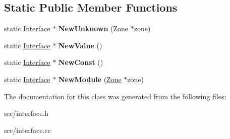 \subsection*{Static Public Member Functions}
\begin{DoxyCompactItemize}
\item 
\hypertarget{classv8_1_1internal_1_1_interface_a8392aeef5f642e6472d4b8c5621197be}{}static \hyperlink{classv8_1_1internal_1_1_interface}{Interface} $\ast$ {\bfseries New\+Unknown} (\hyperlink{classv8_1_1internal_1_1_zone}{Zone} $\ast$zone)\label{classv8_1_1internal_1_1_interface_a8392aeef5f642e6472d4b8c5621197be}

\item 
\hypertarget{classv8_1_1internal_1_1_interface_a6f67d744b08d96c0b52d095f8444f689}{}static \hyperlink{classv8_1_1internal_1_1_interface}{Interface} $\ast$ {\bfseries New\+Value} ()\label{classv8_1_1internal_1_1_interface_a6f67d744b08d96c0b52d095f8444f689}

\item 
\hypertarget{classv8_1_1internal_1_1_interface_ac5c4dd1a524544c34d6d93115c0db43a}{}static \hyperlink{classv8_1_1internal_1_1_interface}{Interface} $\ast$ {\bfseries New\+Const} ()\label{classv8_1_1internal_1_1_interface_ac5c4dd1a524544c34d6d93115c0db43a}

\item 
\hypertarget{classv8_1_1internal_1_1_interface_a9cefe2a879969ac140371a15b91677c7}{}static \hyperlink{classv8_1_1internal_1_1_interface}{Interface} $\ast$ {\bfseries New\+Module} (\hyperlink{classv8_1_1internal_1_1_zone}{Zone} $\ast$zone)\label{classv8_1_1internal_1_1_interface_a9cefe2a879969ac140371a15b91677c7}

\end{DoxyCompactItemize}


The documentation for this class was generated from the following files\+:\begin{DoxyCompactItemize}
\item 
src/interface.\+h\item 
src/interface.\+cc\end{DoxyCompactItemize}
